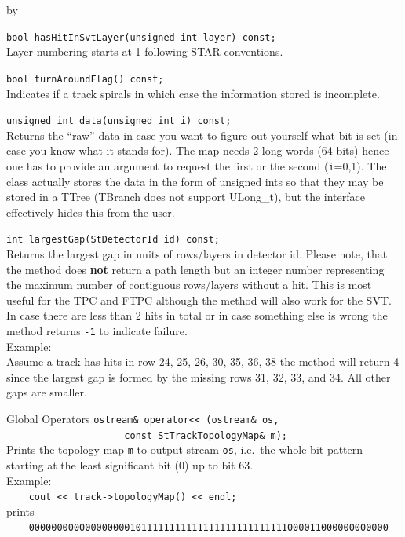 \documentclass[twoside]{article}
\newcommand{\entrylabel}[1]{\mbox{\textbf{{#1}}}\hfil}%
\newenvironment{entry}
{\begin{list}{}%
    {\renewcommand{\makelabel}{\entrylabel}%
     \setlength{\labelwidth}{90pt}%
     \setlength{\leftmargin}{\labelwidth}
     \advance\leftmargin by \labelsep%
      }%
    }%
  {\end{list}}
\newcommand{\Entrylabel}[1]%
{\raisebox{0pt}[1ex][0pt]{\makebox[\labelwidth][l]%
    {\parbox[t]{\labelwidth}{\hspace{0pt}\textbf{{#1}}}}}}
\newenvironment{Entry}%
{\renewcommand{\entrylabel}{\Entrylabel}\begin{entry}}%
  {\end{entry}}
\begin{document}
\begin{Entry}
    \verb+bool hasHitInSvtLayer(unsigned int layer) const;+\\
    Layer numbering starts at 1 following STAR conventions.    

    \verb+bool turnAroundFlag() const;+\\
    Indicates if a track spirals in which case the information stored
    is incomplete. 
    
    \verb+unsigned int data(unsigned int i) const;+\\
    Returns the ``raw'' data in case you want to figure out yourself
    what bit is set (in case you know what it stands for). The map
    needs 2 long words (64 bits) hence one has to provide an argument
    to request the first or the second (\texttt{i}=0,1). The class
    actually stores the data in the form of unsigned ints so that they
    may be stored in a TTree (TBranch does not support ULong\_t),
    but the interface effectively hides this from the user.

    \verb+int largestGap(StDetectorId id) const;+\\  
    Returns the largest gap in units of rows/layers in detector id.
    Please note, that the method does \textbf{not} return a path length
    but an integer number representing the maximum number of contiguous rows/layers
    without a hit. This is most useful for the
    TPC and FTPC although the method will also work for the SVT.
    In case there are less than 2 hits in total or in case something
    else is wrong the method returns \texttt{-1} to indicate failure.\\
    Example: \\
    Assume a track has hits in row 24, 25, 26, 30, 35, 36, 38
    the method will return 4 since the largest gap is formed by the
    missing rows 31, 32, 33, and 34. All other gaps are smaller.
    
\item[Global Operators]
    \verb+ostream& operator<< (ostream& os, +\\
    \verb+                     const StTrackTopologyMap& m);+\\
    Prints the topology map \texttt{m} to output stream \texttt{os}, i.e.~the whole
    bit pattern starting at the least significant bit (0) up to bit 63.\\
    Example:\\
    {\footnotesize
        \verb+    cout << track->topologyMap() << endl;+\\
    }
    prints\\
    {\footnotesize
        \verb+    0000000000000000001011111111111111111111111111000011000000000000+\\
    }
\end{Entry}
\clearpage
\end{document}
